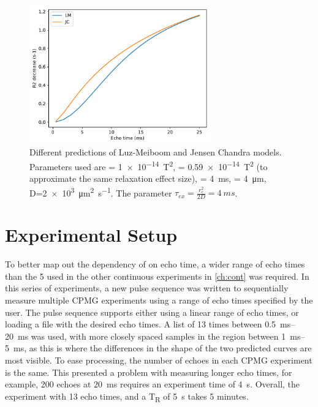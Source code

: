 \begin{figure}[tb]
\centering
\includegraphics[width=0.7\textwidth]{figures/diffmodels/JCLMtheorycomparison.pdf}
\caption[Different predictions of Luz-Meiboom and Jensen Chandra models]{Different predictions of Luz-Meiboom and Jensen Chandra models. Parameters used are \Gzero = \SI{1e-14}{T^2}, \Kzero = \SI{0.59e-14}{T^2} (to approximate the same relaxation effect size), \Texc = \SI{4}{ms}, \rc = \SI{4}{\micro\metre}, D=\SI{2e3}{\micro\metre\squared\per\second}. The parameter $\tau_{ex} = \frac{r_c^2}{2D} = \SI{4}{ms}$.}
\label{fig:dm-JCLMtheory}
\end{figure}

\section{Experimental Setup}
To better map out the dependency of \Ttwo on echo time, a wider range of echo times than the 5 used in the other continuous experiments in \autoref{ch:cont} was required.
In this series of experiments, a new pulse sequence  was written to sequentially measure multiple CPMG experiments using a range of echo times specified by the user.
The pulse sequence supports either using a linear range of echo times, or loading a file with the desired echo times.
A list of 13 times between \SIrange{0.5}{20}{ms} was used, with more closely spaced samples in the region between \SIrange{1}{5}{ms}, as this is where the differences in the shape of the two predicted curves are most visible.
To ease processing, the number of echoes in each CPMG experiment is the same.
This presented a problem with measuring longer echo times, for example, 200 echoes at \SI{20}{ms} requires an experiment time of \SI{4}{\second}.
Overall, the experiment with 13 echo times, and a T\textsubscript{R} of \SI{5}{\second} takes 5 minutes.


